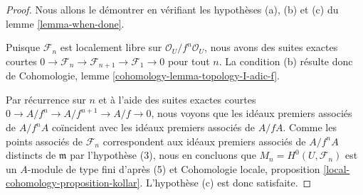 \begin{proof}
Nous allons le démontrer en vérifiant les hypothèses (a), (b) et (c) du
lemme \ref{lemma-when-done}.

\medskip\noindent
Puisque $\mathcal{F}_n$ est localement libre sur $\mathcal{O}_U/f^n\mathcal{O}_U$,
nous avons des suites exactes courtes
$0 \to \mathcal{F}_n \to \mathcal{F}_{n + 1} \to \mathcal{F}_1 \to 0$
pour tout $n$. La condition (b) résulte donc de
Cohomologie, lemme \ref{cohomology-lemma-topology-I-adic-f}.

\medskip\noindent
Par récurrence sur $n$ et à l'aide des suites exactes courtes
$0 \to A/f^n \to A/f^{n + 1} \to A/f \to 0$, nous voyons que
les idéaux premiers associés de $A/f^nA$ coïncident avec les idéaux premiers
associés de $A/fA$. Comme les points associés de $\mathcal{F}_n$
correspondent aux idéaux premiers associés de $A/f^nA$ distincts de $\mathfrak m$
par l'hypothèse (3), nous en concluons que
$M_n = H^0(U, \mathcal{F}_n)$ est un $A$-module de type fini d'après (5) et
Cohomologie locale, proposition \ref{local-cohomology-proposition-kollar}.
L'hypothèse (c) est donc satisfaite.


\end{proof}
